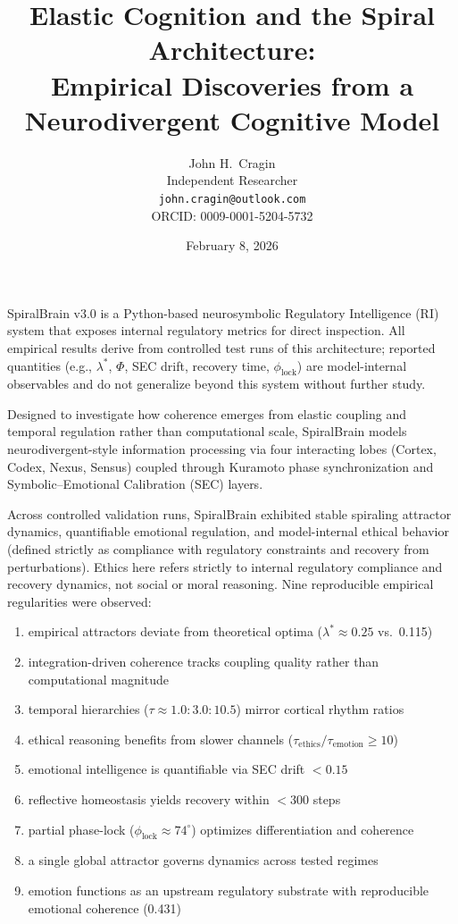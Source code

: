 \documentclass[11pt,a4paper]{article}
\title{Elastic Cognition and the Spiral Architecture:\\
Empirical Discoveries from a Neurodivergent Cognitive Model}
\author{
John H.~Cragin\\
Independent Researcher\\
\texttt{john.cragin@outlook.com}\\
ORCID: 0009-0001-5204-5732
}
\date{February 8, 2026}
\renewenvironment{abstract}{
  \begin{center}
    {\large\bfseries \abstractname\vspace{-.5em}}
  \end{center}
}{}
\begin{document}
\maketitle

\begin{abstract}
SpiralBrain v3.0 is a Python-based neurosymbolic Regulatory Intelligence (RI) system that exposes internal regulatory metrics for direct inspection. All empirical results derive from controlled test runs of this architecture; reported quantities (e.g., \( \lambda^{*} \), \( \Phi \), SEC drift, recovery time, \( \phi_{\text{lock}} \)) are model-internal observables and do not generalize beyond this system without further study.

Designed to investigate how coherence emerges from elastic coupling and temporal regulation rather than computational scale, SpiralBrain models neurodivergent-style information processing via four interacting lobes (Cortex, Codex, Nexus, Sensus) coupled through Kuramoto phase synchronization and Symbolic--Emotional Calibration (SEC) layers.

Across controlled validation runs, SpiralBrain exhibited stable spiraling attractor dynamics, quantifiable emotional regulation, and model-internal ethical behavior (defined strictly as compliance with regulatory constraints and recovery from perturbations). Ethics here refers strictly to internal regulatory compliance and recovery dynamics, not social or moral reasoning. Nine reproducible empirical regularities were observed:
\begin{enumerate}
\item empirical attractors deviate from theoretical optima (\( \lambda^{*} \approx 0.25 \) vs.\ 0.115)\label{reg1}
\item integration-driven coherence tracks coupling quality rather than computational magnitude\label{reg2}
\item temporal hierarchies (\( \tau \approx 1.0:3.0:10.5 \)) mirror cortical rhythm ratios\label{reg3}
\item ethical reasoning benefits from slower channels (\( \tau_{\text{ethics}}/\tau_{\text{emotion}} \ge 10 \))\label{reg4}
\item emotional intelligence is quantifiable via SEC drift \( < 0.15 \)\label{reg5}
\item reflective homeostasis yields recovery within \( < 300 \) steps\label{reg6}
\item partial phase-lock (\( \phi_{\text{lock}} \approx 74^\circ \)) optimizes differentiation and coherence\label{reg7}
\item a single global attractor governs dynamics across tested regimes\label{reg8}
\item emotion functions as an upstream regulatory substrate with reproducible emotional coherence (0.431)\label{reg9}
\end{enumerate}


\end{abstract}
\end{document}
